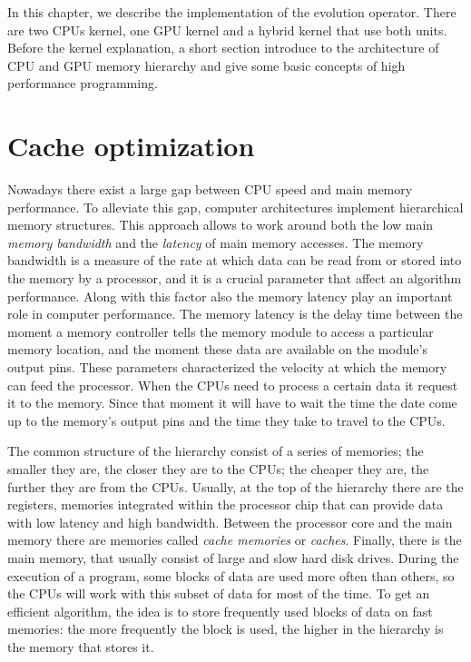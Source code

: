 In this chapter, we describe the implementation of the evolution operator. There are two CPUs kernel, one GPU kernel and a hybrid kernel that use both units. Before the kernel explanation, a short section introduce to the architecture of CPU and GPU memory hierarchy and give some basic concepts of high performance programming.

\section{Cache optimization}
Nowadays there exist a large gap between CPU speed and main memory performance. To alleviate this gap, computer architectures implement hierarchical memory structures. This approach allows to work around both the low main \textit{memory bandwidth} and the \textit{latency} of main memory accesses.
The memory bandwidth is a measure of the rate at which data can be read from or stored into the memory by a processor, and it is a crucial parameter that affect an algorithm performance. Along with this factor also the memory latency play an important role in computer performance. The memory latency is the delay time between the moment a memory controller tells the memory module to access a particular memory location, and the moment these data are available on the module's output pins. These parameters characterized the velocity at which the memory can feed the processor. When the CPUs need to process a certain data it request it to the memory. Since that moment it will have to wait the time the date come up to the memory's output pins and the time they take to travel to the CPUs.
 
  The common structure of the hierarchy consist of a series of memories; the smaller they are, the closer they are to the CPUs; the cheaper they are, the further they are from the CPUs. Usually, at the top of the hierarchy there are the registers, memories integrated within the processor chip that can provide data with low latency and high bandwidth. Between the processor core and the main memory there are memories called \emph{cache memories} or \emph{caches}. Finally, there is the main memory, that usually consist of large and slow hard disk drives. During the execution of a program, some blocks of data are used more often than others, so the CPUs will work with this subset of data for most of the time. To get an efficient algorithm, the idea is to store frequently used blocks of data on fast memories: the more frequently the block is used, the higher in the hierarchy is the memory that stores it. 

